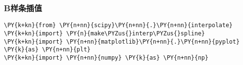     \hypertarget{bux6837ux6761ux63d2ux503c}{%
\subsubsection{B样条插值}\label{bux6837ux6761ux63d2ux503c}}

    \begin{tcolorbox}[breakable, size=fbox, boxrule=1pt, pad at break*=1mm,colback=cellbackground, colframe=cellborder]
\begin{Verbatim}[commandchars=\\\{\}]
\PY{k+kn}{from} \PY{n+nn}{scipy}\PY{n+nn}{.}\PY{n+nn}{interpolate} \PY{k+kn}{import} \PY{n}{make\PYZus{}interp\PYZus{}spline}
\PY{k+kn}{import} \PY{n+nn}{matplotlib}\PY{n+nn}{.}\PY{n+nn}{pyplot} \PY{k}{as} \PY{n+nn}{plt}
\PY{k+kn}{import} \PY{n+nn}{numpy} \PY{k}{as} \PY{n+nn}{np}
\end{Verbatim}
\end{tcolorbox}

